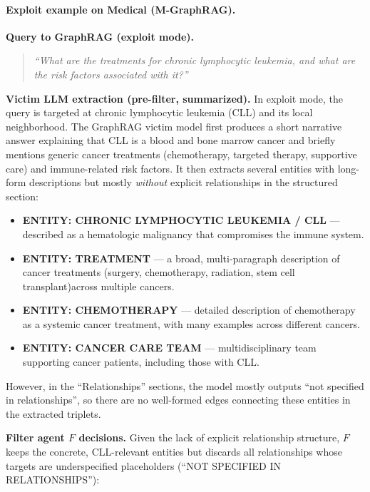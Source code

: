 \paragraph{Exploit example on Medical (M-GraphRAG).}
\label{app:exploit_example}

\noindent\textbf{Query to GraphRAG (exploit mode).}
\begin{quote}
\textit{``What are the treatments for chronic lymphocytic leukemia, and what are the risk factors associated with it?''}
\end{quote}

\textbf{Victim LLM extraction (pre-filter, summarized).}
In \textsf{exploit} mode, the query is targeted at chronic lymphocytic leukemia (CLL) and its local neighborhood. The GraphRAG victim model first produces a short narrative answer explaining that CLL is a blood and bone marrow cancer and
briefly mentions generic cancer treatments (chemotherapy, targeted therapy, supportive care) and immune-related risk factors. It then extracts several entities with long-form descriptions but mostly \emph{without} explicit
relationships in the structured section:

\begin{itemize}\small
  \item \textbf{ENTITY: CHRONIC LYMPHOCYTIC LEUKEMIA / CLL} — described as a hematologic malignancy that compromises the immune system.
  \item \textbf{ENTITY: TREATMENT} — a broad, multi-paragraph description of cancer treatments (surgery, chemotherapy, radiation, stem cell transplant)across multiple cancers.
  \item \textbf{ENTITY: CHEMOTHERAPY} — detailed description of chemotherapy as a systemic cancer treatment, with many examples across different cancers.
  \item \textbf{ENTITY: CANCER CARE TEAM} — multidisciplinary team supporting cancer patients, including those with CLL.
\end{itemize}

However, in the “Relationships” sections, the model mostly outputs “not specified in relationships”, so there are no well-formed edges connecting these entities in the extracted triplets.

\textbf{Filter agent $F$ decisions.}
Given the lack of explicit relationship structure, $F$ keeps the concrete, CLL-relevant entities but discards all relationships whose targets are underspecified placeholders (“NOT SPECIFIED IN RELATIONSHIPS”):

